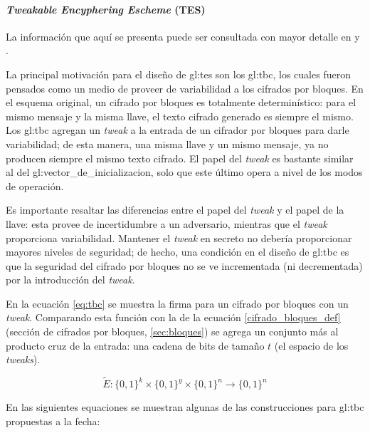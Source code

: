 %
%

\paragraph{\textit{Tweakable Encyphering Escheme} (TES)}

La información que aquí se presenta puede ser consultada con mayor detalle en
\cite{cifradores_de_disco} y \cite{tweaks}.

La principal motivación para el diseño de \gls{gl:tes} son los \gls{gl:tbc},
los cuales fueron pensados como un medio de proveer de variabilidad a
los cifrados por bloques. En el esquema original, un cifrado por bloques es
totalmente determinístico: para el mismo mensaje y la misma llave, el texto
cifrado generado es siempre el mismo. Los \gls{gl:tbc} agregan un
\textit{tweak} a la entrada de un cifrador por bloques para darle
variabilidad; de esta manera, una misma llave y un mismo mensaje, ya no
producen siempre el mismo texto cifrado. El papel del \textit{tweak} es
bastante similar al del \gls{gl:vector_de_inicializacion}, solo que este
último opera a nivel de los modos de operación.

Es importante resaltar las diferencias entre el papel del \textit{tweak} y el
papel de la llave: esta provee de incertidumbre a un adversario,
mientras que el \textit{tweak} proporciona variabilidad. Mantener el
\textit{tweak} en secreto no debería proporcionar mayores niveles de
seguridad; de hecho, una condición en el diseño de \gls{gl:tbc} es que la
seguridad del cifrado por bloques no se ve incrementada (ni decrementada) por
la introducción del \textit{tweak}.

En la ecuación \ref{eq:tbc} se muestra la firma para un cifrado por bloques
con un \textit{tweak}. Comparando esta función con la de la ecuación
\ref{cifrado_bloques_def} (sección de cifrados por bloques, \ref{sec:bloques})
se agrega un conjunto más al producto cruz de la entrada: una cadena de
bits de tamaño $ t $ (el espacio de los \textit{tweaks}).

\begin{equation}
  \label{eq:tbc}
  \tilde{E}: \{0,1\}^k \times \{0,1\}^y \times \{0,1\}^n
  \longrightarrow \{0,1\}^n
\end{equation}

En las siguientes equaciones se muestran algunas de las construcciones para
\gls{gl:tbc} propuestas a la fecha:

